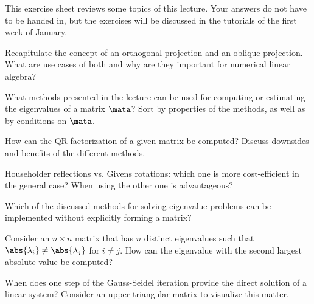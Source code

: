 
\begin{Sheet}
  \label{sheet9}


  This exercise sheet reviews some topics of this lecture. Your
  answers do not have to be handed in, but the exercises will be
  discussed in the tutorials of the first week of January.

  \begin{Problem}
    Recapitulate the concept of an orthogonal projection and an
    oblique projection. What are use cases of both and why are they
    important for numerical linear algebra?
  \end{Problem}

  \begin{Problem}
    What methods presented in the lecture can be used for computing or
    estimating the eigenvalues of a matrix $\mata$? Sort by properties
    of the methods, as well as by conditions on $\mata$.
  \end{Problem}

  \begin{Problem}
    How can the QR factorization of a given matrix be computed?
    Discuss downsides and benefits of the different methods.
  \end{Problem}

  \begin{Problem}
    Householder reflections vs. Givens rotations: which one is more
    cost-efficient in the general case? When using the other one is
    advantageous?
  \end{Problem}

  \begin{Problem}
    Which of the discussed methods for solving eigenvalue problems can
    be implemented without explicitly forming a matrix?
  \end{Problem}

  \begin{Problem}
    Consider an $n\times n$ matrix that has $n$ distinct eigenvalues
    such that $\abs{\lambda_i} \neq \abs{\lambda_j}$ for $i\neq
    j$. How can the eigenvalue with the second largest absolute value
    be computed?
  \end{Problem}

  \begin{Problem}
    When does one step of the Gauss-Seidel iteration provide the
    direct solution of a linear system? Consider an upper triangular
    matrix to visualize this matter.
  \end{Problem}

\end{Sheet}



